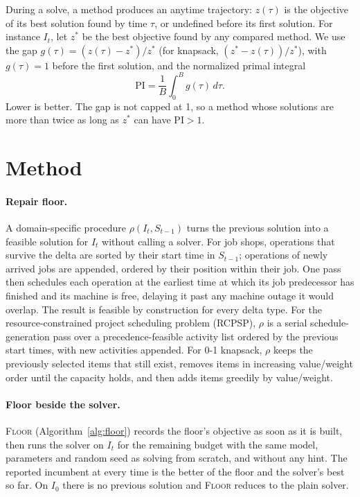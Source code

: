 \documentclass[letterpaper]{article} %
\newcommand{\mfloor}{\textsc{Floor}}
\begin{document}
During a solve, a method produces an anytime trajectory: $z(\tau)$ is the objective of its best solution found by time $\tau$, or undefined before its first solution. For instance $I_t$, let $z^*$ be the best objective found by any compared method. We use the gap $g(\tau) = (z(\tau) - z^*)/z^*$ (for knapsack, $(z^* - z(\tau))/z^*$), with $g(\tau) = 1$ before the first solution, and the normalized primal integral
\begin{equation}
\mathrm{PI} = \frac{1}{B}\int_0^B g(\tau)\,d\tau .
\end{equation}
Lower is better. The gap is not capped at 1, so a method whose solutions are more than twice as long as $z^*$ can have $\mathrm{PI} > 1$.

\section{Method}

\paragraph{Repair floor.} A domain-specific procedure $\rho(I_t, S_{t-1})$ turns the previous solution into a feasible solution for $I_t$ without calling a solver. For job shops, operations that survive the delta are sorted by their start time in $S_{t-1}$; operations of newly arrived jobs are appended, ordered by their position within their job. One pass then schedules each operation at the earliest time at which its job predecessor has finished and its machine is free, delaying it past any machine outage it would overlap. The result is feasible by construction for every delta type. For the resource-constrained project scheduling problem (RCPSP), $\rho$ is a serial schedule-generation pass \citep{kolisch1996} over a precedence-feasible activity list ordered by the previous start times, with new activities appended. For 0-1 knapsack, $\rho$ keeps the previously selected items that still exist, removes items in increasing value/weight order until the capacity holds, and then adds items greedily by value/weight.

\paragraph{Floor beside the solver.} \mfloor{} (Algorithm~\ref{alg:floor}) records the floor's objective as soon as it is built, then runs the solver on $I_t$ for the remaining budget with the same model, parameters and random seed as solving from scratch, and without any hint. The reported incumbent at every time is the better of the floor and the solver's best so far. On $I_0$ there is no previous solution and \mfloor{} reduces to the plain solver.
\end{document}

